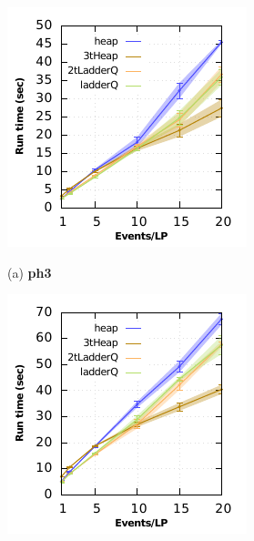 \begin{figure}
\begin{minipage}{0.24\linewidth}
\includegraphics[width=\linewidth]{images/ph3_run_time}
\centerline{(a) \textbf{ph3}}
\end{minipage}
\begin{minipage}{0.24\linewidth}
\includegraphics[width=\linewidth]{images/ph4_run_time}

\end{minipage}
\end{figure}
